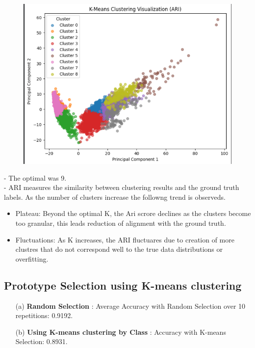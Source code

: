 \documentclass{article}
\begin{document}
\begin{enumerate}
\begin{figure}[H]
\begin{minipage}{0.45\textwidth}
            \includegraphics[width=\textwidth]{Ari_graph.png}
            \label{fig:ari_graph}
        \end{minipage}
    \end{figure}
    - The optimal was 9.\\
    - ARI measures the similarity between clustering results and the ground truth labels. As the number of clusters increase the followng trend is observeds.
    \begin{itemize}
        \item Plateau: Beyond the optimal K, the Ari scrore declines as the clusters become too granular, this leads reduction of alignment with the ground truth.
        \item Fluctuations: As K increases, the ARI fluctuares due to creation of more clustres that do not correspond well to the true data distributions or overfitting.
    \end{itemize}
\end{enumerate}

\subsection{Prototype Selection using K-means clustering}
\begin{enumerate}
    \item [(a)] \textbf{Random Selection} : Average Accuracy with Random Selection over 10 repetitions: 0.9192.
    \item [(b)] \textbf{Using K-means clustering by Class} : Accuracy with K-means Selection: 0.8931.
\end{enumerate}
\end{document}

